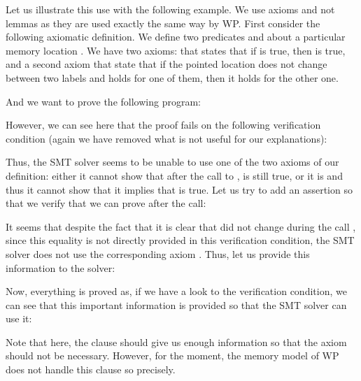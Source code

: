 Let us illustrate this use with the following example. We use axioms and not
lemmas as they are used exactly the same way by WP. First consider the following
axiomatic definition. We define  two predicates  and
 about a particular memory location . We have two
axioms:  that states that if  is true, then
 is true, and a second axiom  that state that
if the pointed location does not change between two labels and 
holds for one of them, then it holds for the other one.





And we want to prove the following program:




However, we can see here that the proof fails on the following verification
condition (again we have removed what is not useful for our explanations):




Thus, the SMT solver seems to be unable to use one of the two axioms of our
definition: either it cannot show that after the call to ,
 is still true, or it is and thus it cannot show that it
implies that  is true. Let us try to add an assertion so that
we verify that we can prove  after the call:








It seems that despite the fact that it is clear that  did not
change during the call , since this equality is not directly
provided in this verification condition, the SMT solver does not use the
corresponding axiom . Thus, let us provide this information to
the solver:





Now, everything is proved as, if we have a look to the verification condition,
we can see that this important information is provided so that the SMT solver
can use it:




Note that here, the  clause should give us enough information
so that the axiom  should not be necessary. However, for the
moment, the memory model of WP does not handle this clause so precisely.



